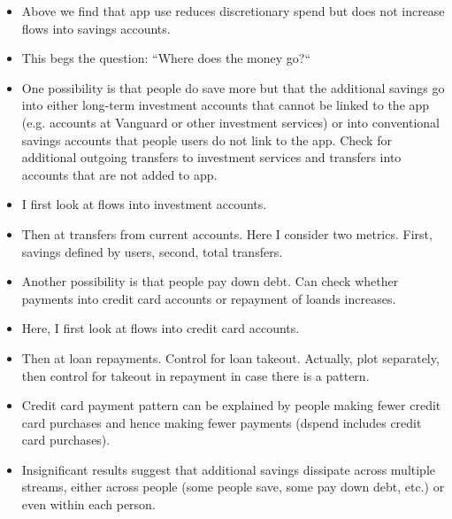 \begin{itemize}
    \item Above we find that app use reduces discretionary spend but does not
        increase flows into savings accounts.

    \item This begs the question: ``Where does the money go?``

    \item One possibility is that people do save more but that the additional
        savings go into either long-term investment accounts that cannot be
        linked to the app (e.g. accounts at Vanguard or other investment
        services) or into conventional savings accounts that people users do
        not link to the app. Check for additional outgoing transfers to
        investment services and transfers into accounts that are not added to
        app.

    \item I first look at flows into investment accounts.

    \item Then at transfers from current accounts. Here I consider two metrics.
        First, savings defined by users, second, total transfers.

    \item Another possibility is that people pay down debt. Can check whether
        payments into credit card accounts or repayment of loands increases.

    \item Here, I first look at flows into credit card accounts.

    \item Then at loan repayments. Control for loan takeout. Actually, plot
        separately, then control for takeout in repayment in case there is a
        pattern.

    \item Credit card payment pattern can be explained by people making fewer
        credit card purchases and hence making fewer payments (dspend includes
        credit card purchases).

    \item Insignificant results suggest that additional savings dissipate
        across multiple streams, either across people (some people save, some
        pay down debt, etc.) or even within each person.

\end{itemize}

